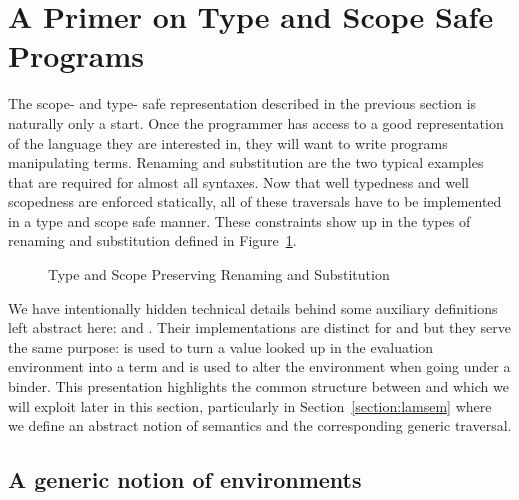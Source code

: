 

\section{A Primer on Type and Scope Safe Programs}\label{section:primer-program}

The scope- and type- safe representation described in the previous
section is naturally only a start. Once the programmer has access to a
good representation of the language they are interested in, they will
want to write programs manipulating terms.  Renaming and substitution
are the two typical examples that are required for almost all
syntaxes. Now that well typedness and well scopedness are enforced
statically, all of these traversals have to be implemented in a type
and scope safe manner.  These constraints show up in the types of
renaming and substitution defined in Figure~\ref{figure:rensubACMM}.

\begin{figure}[h]
\begin{minipage}{0.50\textwidth}
\end{minipage}\hfill
\begin{minipage}{0.50\textwidth}
\end{minipage}
\caption{Type and Scope Preserving Renaming and Substitution}
\label{figure:rensubACMM}
\end{figure}

We have intentionally hidden technical details behind some auxiliary definitions
left abstract here:  and . Their implementations are distinct
for  and  but they serve the same purpose:  is used to
turn a value looked up in the evaluation environment into a term and 
is used to alter the environment when going under a binder. This presentation
highlights the common structure between  and  which we will exploit
later in this section, particularly in Section~\ref{section:lamsem}
where we define an abstract notion of semantics and the corresponding generic traversal.

\subsection{A generic notion of environments}\label{sec:genenvironment}

